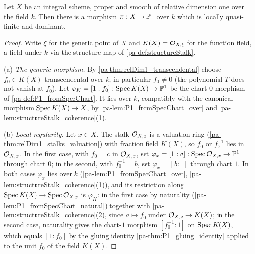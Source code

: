 \begin{theorem}
  \label{pa-thm:exists_lqf_dominant_toP1}
  \leanok

  Let \(X\) be an integral scheme, proper and smooth of relative dimension one over the
  field \(k\). Then there is a morphism \(\pi : X \to \mathbb{P}^1\) over \(k\) which is locally
  quasi-finite and dominant.
\end{theorem}
\begin{proof}
  \leanok
  Write \(\xi\) for the generic point of \(X\) and \(K(X) = \mathcal{O}_{X,\xi}\) for the
  function field, a field under \(k\) via the structure map of \ref{pa-def:structureStalk}.

  (a) \emph{The generic morphism.} By \ref{pa-thm:relDim1_transcendental} choose
  \(f_0 \in K(X)\) transcendental over \(k\); in particular \(f_0 \neq 0\) (the polynomial
  \(T\) does not vanish at \(f_0\)). Let
  \(\varphi_K = [1 : f_0] : \operatorname{Spec} K(X) \to \mathbb{P}^1\) be the chart-\(0\) morphism of
  \ref{pa-def:P1_fromSpecChart}. It lies over \(k\), compatibly with the canonical morphism
  \(\operatorname{Spec} K(X) \to X\), by \ref{pa-lem:P1_fromSpecChart_over} and
  \ref{pa-lem:structureStalk_coherence}(1).

  (b) \emph{Local regularity.} Let \(x \in X\). The stalk \(\mathcal{O}_{X,x}\) is a valuation
  ring (\ref{pa-thm:relDim1_stalks_valuation}) with fraction field \(K(X)\), so \(f_0\) or
  \(f_0^{-1}\) lies in \(\mathcal{O}_{X,x}\). In the first case, with \(f_0 = a\) in
  \(\mathcal{O}_{X,x}\), set \(\varphi_x = [1 : a] : \operatorname{Spec} \mathcal{O}_{X,x} \to \mathbb{P}^1\) through
  chart \(0\); in the second, with \(f_0^{-1} = b\), set \(\varphi_x = [b : 1]\) through
  chart \(1\). In both cases \(\varphi_x\) lies over \(k\)
  (\ref{pa-lem:P1_fromSpecChart_over}, \ref{pa-lem:structureStalk_coherence}(1)), and its
  restriction along \(\operatorname{Spec} K(X) \to \operatorname{Spec} \mathcal{O}_{X,x}\) is \(\varphi_K\): in the first
  case by naturality (\ref{pa-lem:P1_fromSpecChart_natural}) together with
  \ref{pa-lem:structureStalk_coherence}(2), since \(a \mapsto f_0\) under
  \(\mathcal{O}_{X,x} \to K(X)\); in the second case, naturality gives the chart-\(1\)
  morphism \([f_0^{-1} : 1]\) on \(\operatorname{Spec} K(X)\), which equals \([1 : f_0]\) by the gluing
  identity \ref{pa-thm:P1_gluing_identity} applied to the unit \(f_0\) of the field
  \(K(X)\).


\end{proof}
